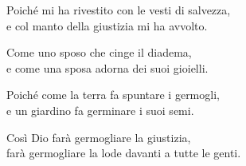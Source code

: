 
 

\spazio

\strofa Poiché mi ha rivestito con le vesti di salvezza,\\
e col manto della giustizia mi ha avvolto. 

\spazio


\spazio

Come uno sposo che cinge il diadema,\\
e come una sposa adorna dei suoi gioielli. 

\spazio


\spazio

\strofa Poiché come la terra fa spuntare i germogli,\\
e un giardino fa germinare i suoi semi. 

\spazio
Così Dio farà germogliare la giustizia,\\
farà germogliare la lode davanti a tutte le genti. 

\spazio

